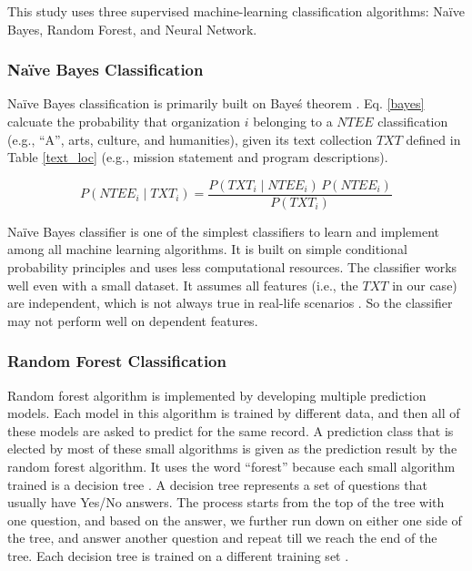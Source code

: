 \documentclass[12pt]{article}
\begin{document}
This study uses three supervised machine-learning classification algorithms: Na\"ive Bayes, Random Forest, and Neural Network.

\subsubsection{Na\"ive Bayes Classification}

Na\"ive Bayes classification is primarily built on Baye\'s theorem \parencites[34]{upton2014dictionary}. Eq. \ref{bayes} calcuate the probability that organization $i$ belonging to a $NTEE$ classification (e.g., ``A'', arts, culture, and humanities), given its text collection $TXT$ defined in Table \ref{text_loc} (e.g., mission statement and program descriptions). 

\begin{equation} \label{bayes}
 P(NTEE_i \mid TXT_i) = \frac{P(TXT_i \mid NTEE_i) \, P(NTEE_i)}{P(TXT_i)} 
\end{equation}

Na\"ive Bayes classifier is one of the simplest classifiers to learn and implement among all machine learning algorithms. It is built on simple conditional probability principles and uses less computational resources. The classifier works well even with a small dataset. It assumes all features (i.e., the $TXT$ in our case) are independent, which is not always true in real-life scenarios \parencites{lewis1998naive}. So the classifier may not perform well on dependent features.

\subsubsection{Random Forest Classification}


Random forest algorithm is implemented by developing multiple prediction models. Each model in this algorithm is trained by different data, and then all of these models are asked to predict for the same record. A prediction class that is elected by most of these small algorithms is given as the prediction result by the random forest algorithm. It uses the word ``forest'' because each small algorithm trained is a decision tree \parencites[83]{quinlan1986induction}. A decision tree represents a set of questions that usually have Yes/No answers. The process starts from the top of the tree with one question, and based on the answer, we further run down on either one side of the tree, and answer another question and repeat till we reach the end of the tree. Each decision tree is trained on a different training set \parencites[124]{breiman1996bagging}. 
\end{document}
